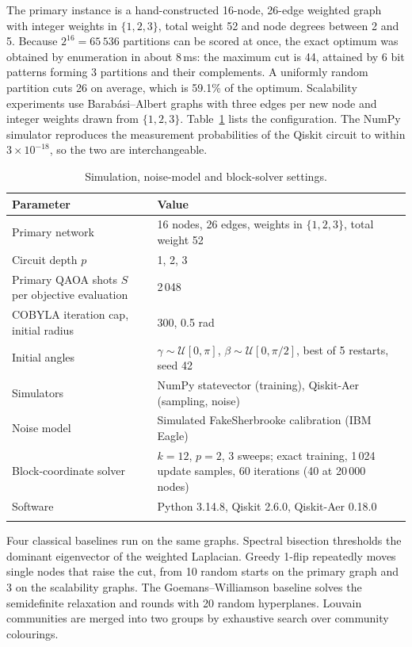 \documentclass[pdflatex,sn-mathphys-num]{sn-jnl}
\theoremstyle{thmstyleone}
\theoremstyle{thmstyletwo}
\theoremstyle{thmstylethree}
\begin{document}
The primary instance is a hand-constructed 16-node, 26-edge weighted graph with integer weights in $\{1,2,3\}$, total weight 52 and node degrees between 2 and 5. Because $2^{16}=65\,536$ partitions can be scored at once, the exact optimum was obtained by enumeration in about 8\,ms: the maximum cut is 44, attained by 6 bit patterns forming 3 partitions and their complements. A uniformly random partition cuts 26 on average, which is 59.1\% of the optimum. Scalability experiments use Barab\'asi--Albert graphs with three edges per new node and integer weights drawn from $\{1,2,3\}$. Table~\ref{tab:config} lists the configuration. The NumPy simulator reproduces the measurement probabilities of the Qiskit circuit to within $3\times10^{-18}$, so the two are interchangeable.

\begin{table}[h]
\caption{Simulation, noise-model and block-solver settings.}\label{tab:config}
\begin{tabular}{@{}p{}p{}@{}}
\toprule
Parameter & Value \\
\midrule
Primary network & 16 nodes, 26 edges, weights in $\{1,2,3\}$, total weight 52 \\
Circuit depth $p$ & 1, 2, 3 \\
Primary QAOA shots $S$ per objective evaluation & 2\,048 \\
COBYLA iteration cap, initial radius & 300, 0.5 rad \\
Initial angles & $\gamma\sim\mathcal{U}[0,\pi]$, $\beta\sim\mathcal{U}[0,\pi/2]$, best of 5 restarts, seed 42 \\
Simulators & NumPy statevector (training), Qiskit-Aer (sampling, noise) \\
Noise model & Simulated FakeSherbrooke calibration (IBM Eagle) \\
Block-coordinate solver & $k=12$, $p=2$, 3 sweeps; exact training, 1\,024 update samples, 60 iterations (40 at 20\,000 nodes) \\
Software & Python 3.14.8, Qiskit 2.6.0, Qiskit-Aer 0.18.0 \\
\botrule
\end{tabular}
\end{table}

Four classical baselines run on the same graphs. Spectral bisection thresholds the dominant eigenvector of the weighted Laplacian. Greedy 1-flip repeatedly moves single nodes that raise the cut, from 10 random starts on the primary graph and 3 on the scalability graphs. The Goemans--Williamson baseline solves the semidefinite relaxation and rounds with 20 random hyperplanes. Louvain communities are merged into two groups by exhaustive search over community colourings.
\end{document}
